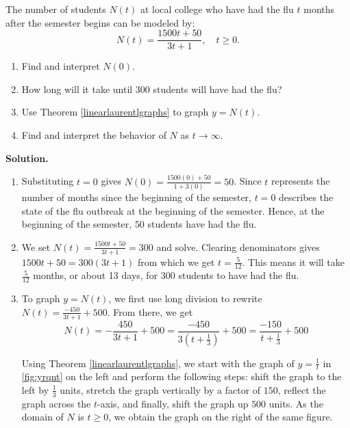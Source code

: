 \begin{ex}
\begin{ex}  \label{fluex} The number of students $N(t)$ at local college who have had the flu $t$ months after the semester begins can be modeled by: \[ N(t) = \dfrac{1500t + 50}{3t+1},  \quad t \geq 0.\]

\begin{enumerate}

\item  Find and interpret $N(0)$.

\item  How long will it take until $300$ students will have had the flu?

\item  Use Theorem \ref{linearlaurentlgraphs} to graph $y = N(t)$.  

\item  Find and interpret the behavior of $N$ as $t \rightarrow \infty$.  

\end{enumerate}

{ \bf Solution.}

\begin{enumerate}

\item  Substituting $t=0$ gives $N(0) = \frac{1500(0) + 50}{1+3(0)} = 50$.  Since $t$ represents the number of months since the beginning of the semester, $t=0$ describes the state of the flu outbreak at the beginning of the semester. Hence,  at the beginning of the semester, $50$ students have had the flu.

\item  We set $N(t) = \frac{1500t + 50}{3t+1}  = 300$ and solve.  Clearing denominators gives $1500t + 50 = 300(3t+1)$ from which we get $t = \frac{5}{12}$.  This means it will take $\frac{5}{12}$ months, or about 13 days, for $300$ students to have had the flu.

\item To graph $y = N(t)$, we first use long division to rewrite $N(t) = \frac{-450}{3t+1} + 500$.  From there, we get  \[N(t) =  -\frac{450}{3t+1} + 500  = \frac{-450}{3\left(t + \frac{1}{3}\right)} + 500 = \frac{-150}{t+\frac{1}{3}} + 500\]

Using Theorem \ref{linearlaurentlgraphs}, we start with the graph of $y = \frac{1}{t}$ in \autoref{fig:yrqnt} on the left and perform the following steps: shift the graph to the left by $\frac{1}{3}$ units, stretch the graph vertically by a factor of $150$, reflect the graph across the $t$-axis, and finally, shift the graph up $500$ units.   As the domain of $N$ is $t \geq 0$, we obtain the graph on the right of the same figure.


\end{enumerate}
\end{ex}
\end{ex}

